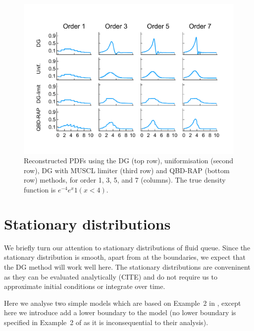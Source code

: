 \begin{example}
\begin{figure}
		\includegraphics[width=\textwidth]{chapter6/figs/wave/fun1/pdf_formatted.pdf}
		\caption{Reconstructed PDFs using the DG (top row), uniformisation (second row), DG with MUSCL limiter (third row) and QBD-RAP (bottom row) methods, for order 1, 3, 5, and 7 (columns). The true density function is \(e^{-4}e^{x}1(x<4)\).} 
		\label{fig: pdf wave fun 1}
	\end{figure} 
\end{example} 

\FloatBarrier

\section{Stationary distributions} \label{sec:stat}
We briefly turn our attention to stationary distributions of fluid queue. Since the stationary distribution is smooth, apart from at the boundaries, we expect that the DG method will work well here. The stationary distributions are conveninent as they can be evaluated analytically (CITE) and do not require us to approximate initial conditions or integrate over time.

Here we analyse two simple models which are based on Example~2 in \citep{bean2009}, except here we introduce add a lower boundary to the model (no lower boundary is specified in Example~2 of \citep{bean2009} as it is inconsequential to their analysis). 


